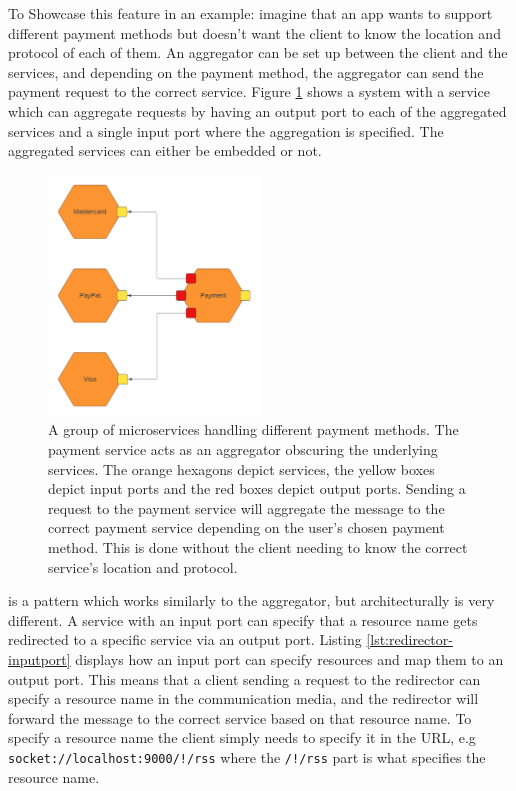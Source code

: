 To Showcase this feature in an example: imagine that an app wants to support different payment methods but doesn't want the client to know the location and protocol of each of them. An aggregator can be set up between the 
client and the services, and depending on the payment method, the aggregator can send the payment request to the correct service.
Figure \ref*{figure:aggregator_example} shows a system with a service which can aggregate requests by having an output port to each of the aggregated services and a single input port where the aggregation is specified. The aggregated services can either be embedded or not.
\begin{figure}[h!]
    \center
    \includegraphics[width=0.5\textwidth]{figures/aggregator_example.png}
    \caption{A group of microservices handling different payment methods. The payment service acts as an aggregator obscuring the underlying services. The orange hexagons depict services, the yellow boxes depict input ports and the red boxes depict output ports.
    Sending a request to the payment service will aggregate the message to the correct payment service depending on the user's chosen payment method. This is done without the client needing to know the correct service's location and protocol.}
    \label{figure:aggregator_example}
\end{figure}
 is a pattern which works similarly to the aggregator, but architecturally is very different.
A service with an input port can specify that a resource name gets redirected to a specific service via an output port.
Listing \ref*{lst:redirector-inputport} displays how an input port can specify resources and map them to an output port.
This means that a client sending a request to the redirector can specify a resource name in the communication media, and the redirector will forward the message to the correct service based on that resource name.
To specify a resource name the client simply needs to specify it in the URL, e.g \texttt{socket://localhost:9000/!/rss} where the \texttt{/!/rss} part is what specifies the resource name.

